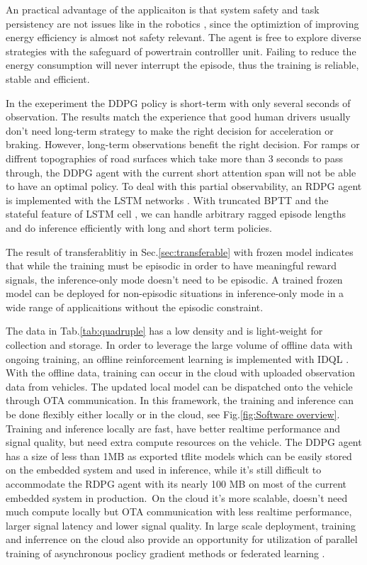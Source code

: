 \documentclass{article}
\begin{document}
An practical advantage of the applicaiton is that system safety and task persistency are not issues like in the robotics \parencite{DBLP:journals_ijrr_IbarzTFKPL21}, since the optimiztion of improving energy efficiency is almost not safety relevant. The agent is free to explore diverse strategies with the safeguard of powertrain controlller unit. Failing to reduce the energy consumption will never interrupt the episode, thus the training is reliable, stable and efficient.

In the exeperiment the DDPG policy is short-term with only several seconds of observation. The results match the experience that good human drivers usually don't need long-term strategy to make the right decision for acceleration or braking. However, long-term observations benefit the right decision. For ramps or diffrent topographies of road surfaces which take more than 3 seconds to pass through, the DDPG agent with the current short attention span will not be able to have an optimal policy. To deal with this partial observability, an RDPG agent \parencite{heess15:_memor} is implemented with the LSTM networks \parencite{Hochreiter_1997}. With truncated BPTT \parencite{sutskever2013training} and the stateful feature of LSTM cell \parencite{chollet2015keras}, we can handle arbitrary ragged episode lengths and do inference efficiently with long and short term policies.

The result of transferablitiy in Sec.\@\ref{sec:transferable} with frozen model indicates that while the training must be episodic in order to have meaningful reward signals, the inference-only mode doesn't need to be episodic. A trained frozen model can be deployed for non-episodic situations in inference-only mode in a wide range of applicaitions without the episodic constraint.

The data in Tab.\@\ref{tab:quadruple} has a low density and is light-weight for collection and storage. In order to leverage the large volume of offline data with ongoing training, an offline reinforcement learning is implemented with IDQL \parencite{hansen-estruch23:_idql}. With the offline data, training can occur in the cloud with uploaded observation data from vehicles. The updated local model can be dispatched onto the vehicle through OTA communication. In this framework, the training and inference can be done flexibly either locally or in the cloud, see Fig.\@\ref{fig:Software overview}. Training and inference locally are fast, have better realtime performance and signal quality, but need extra compute resources on the vehicle. The DDPG agent has a size of less than 1MB as exported tflite models which can be easily stored on the embedded system and used in inference, while it's still difficult to accommodate the RDPG agent with its nearly 100 MB on most of the current embedded system in production.\ On the cloud it's more scalable, doesn't need much compute locally but OTA communication with less realtime performance, larger signal latency and lower signal quality. In large scale deployment, training and inferrence on the cloud also provide an opportunity for utilization of parallel training of asynchronous poclicy gradient methods \parencite{mnih16:_async_method_deep_reinf_learn} or federated learning \parencite{konečný15:_feder_optim}.
\end{document}
